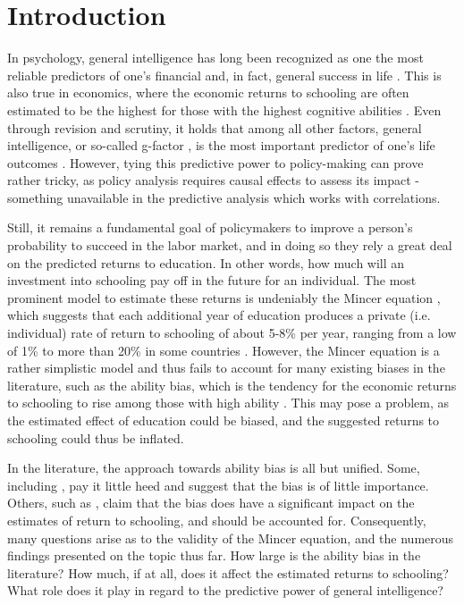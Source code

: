 \chapter{Introduction}
\label{chap:one}

In psychology, general intelligence has long been recognized as one the most reliable predictors of one's financial and, in fact, general success in life \citep{deary2007intelligence,gottfredson1997g}. This is also true in economics, where the economic returns to schooling are often estimated to be the highest for those with the highest cognitive abilities \citep{herrnstein2010bell}. Even through revision and scrutiny, it holds that among all other factors, general intelligence, or so-called g-factor \citep{olea1994predicting}, is the most important predictor of one's life outcomes \citep{ganzach2018wages}. However, tying this predictive power to policy-making can prove rather tricky, as policy analysis requires causal effects to assess its impact - something unavailable in the predictive analysis which works with correlations.

Still, it remains a fundamental goal of policymakers to improve a person's probability to succeed in the labor market, and in doing so they rely a great deal on the predicted returns to education. In other words, how much will an investment into schooling pay off in the future for an individual. The most prominent model to estimate these returns is undeniably the Mincer equation \citep{mincer1974schooling}, which suggests that each additional year of education produces a private (i.e. individual) rate of return to schooling of about 5-8\% per year, ranging from a low of 1\% to more than 20\% in some countries \citep{psacharopoulos2018meta}. However, the Mincer equation is a rather simplistic model and thus fails to account for many existing biases in the literature, such as the ability bias, which is the tendency for the economic returns to schooling to rise among those with high ability \citep{griliches1977estimating,heckman2001identifying}. This may pose a problem, as the estimated effect of education could be biased, and the suggested returns to schooling could thus be inflated.

In the literature, the approach towards ability bias is all but unified. Some, including \cite{ashenfelter1999schooling}, pay it little heed and suggest that the bias is of little importance. Others, such as \cite{wincenciak2022meta}, claim that the bias does have a significant impact on the estimates of return to schooling, and should be accounted for. Consequently, many questions arise as to the validity of the Mincer equation, and the numerous findings presented on the topic thus far. How large is the ability bias in the literature? How much, if at all, does it affect the estimated returns to schooling? What role does it play in regard to the predictive power of general intelligence?

